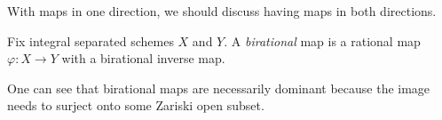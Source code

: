 \documentclass[../notes.tex]{subfiles}
\begin{document}
With maps in one direction, we should discuss having maps in both directions.
\begin{definition}[birational]
	Fix integral separated schemes $X$ and $Y$. A \textit{birational} map is a rational map $\varphi\colon X\to Y$ with a birational inverse map.
\end{definition}
\begin{remark}
	One can see that birational maps are necessarily dominant because the image needs to surject onto some Zariski open subset.
\end{remark}
\end{document}
